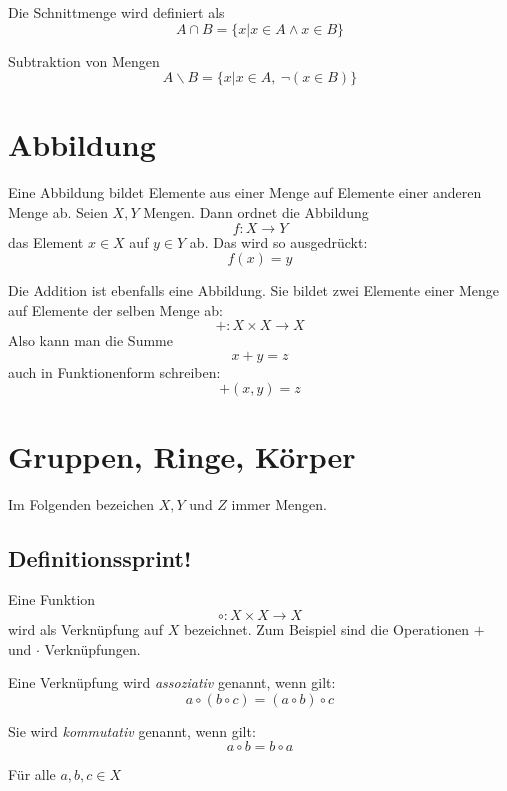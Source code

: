 \begin{definition}
Die Schnittmenge wird definiert als 
\[A \cap B = \{x| x\in A \wedge x\in B \} \]
\end{definition}

\begin{definition}
Subtraktion von Mengen
\[ A \backslash B = \{ x \vert x\in A, \  \neg (x\in B) \} \]
\end{definition}

\section{Abbildung}
Eine Abbildung bildet Elemente aus einer Menge auf Elemente einer anderen Menge ab. Seien $X,Y$ Mengen. Dann ordnet die Abbildung
\[ f : X \longrightarrow Y \]
das Element $x\in X$ auf $y\in Y$ ab. Das wird so ausgedrückt:
\[ f(x) = y\]

Die Addition ist ebenfalls eine Abbildung. Sie bildet zwei Elemente einer Menge auf Elemente der selben Menge ab:
\[ + : X \times X \longrightarrow X \]
Also kann man die Summe 
\[ x+y = z\]
auch in Funktionenform schreiben:
\[ +(x,y) = z\]

\section{Gruppen, Ringe, Körper}
Im Folgenden bezeichen $X,Y$ und $Z$ immer Mengen.

\subsection{Definitionssprint!}

\begin{definition}
Eine Funktion 
\[ \circ : X \times X \longrightarrow X \]
wird als Verknüpfung auf $X$ bezeichnet. Zum Beispiel sind die Operationen $+$ und $\cdot$ Verknüpfungen. 
\end{definition}

\begin{definition} 
Eine Verknüpfung wird \textsl{assoziativ} genannt, wenn gilt:
\[ a \circ (b \circ c) = (a \circ b) \circ c \]
\end{definition}
\begin{definition}
Sie wird \textsl{kommutativ} genannt, wenn gilt: 
\[ a \circ b = b \circ a \]
\end{definition}
\noindent Für alle $a,b,c \in X$

